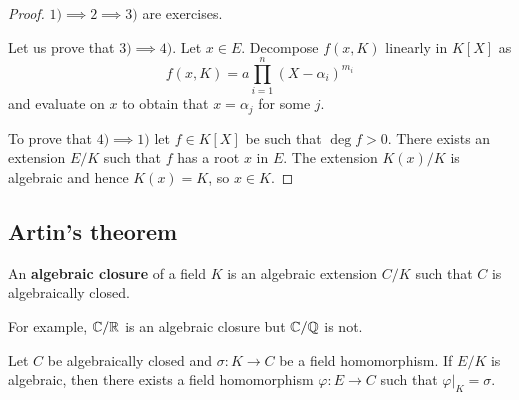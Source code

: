 \begin{proof}
	$1)\implies 2\implies 3)$ are exercises.  
	
	Let us prove that $3)\implies
	4)$. Let $x\in E$. Decompose $f(x,K)$ linearly in $K[X]$ as
	\[
        f(x,K)=a\prod_{i=1}^n(X-\alpha_i)^{m_i}
        \]
        and evaluate on $x$ to obtain that
	$x=\alpha_j$ for some $j$. 
	
	To prove that $4)\implies 1)$ let $f\in K[X]$ be
	such that $\deg f>0$. There exists an extension $E/K$ such that $f$ has a
	root $x$ in $E$. The extension $K(x)/K$ is algebraic and hence $K(x)=K$, so
	$x\in K$. 
\end{proof}



\subsection{Artin's theorem}

\begin{definition}
	An \textbf{algebraic closure} of a field $K$ is an algebraic extension $C/K$ 
	such that $C$ is algebraically closed. 
\end{definition}

For example, $\mathbb{C}/\mathbb{R}$ is an algebraic closure but $\mathbb{C}/\mathbb{Q}$ is not. 

\begin{proposition}
\label{pro:Artin}
	Let $C$ be algebraically closed and $\sigma\colon K\to C$ be a field homomorphism. If $E/K$ 
	is algebraic, then there exists a field homomorphism 
	$\varphi\colon E\to C$ such that 
	$\varphi|_K=\sigma$. 
\end{proposition}

